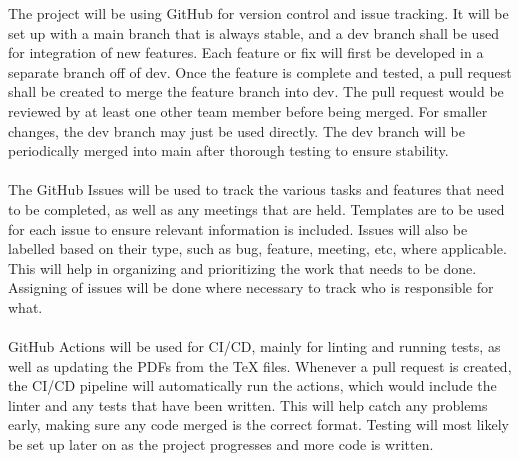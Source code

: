\documentclass{article}
\begin{document}
{	%
  
  The project will be using GitHub for version control and issue tracking. 
  It will be set up with a main branch that is always stable, and
  a dev branch shall be used for integration of new features. Each feature 
  or fix will first be developed in a separate branch off of dev. 
  Once the feature is complete and tested, a pull request shall be created 
  to merge the feature branch into dev. The pull request would be 
  reviewed by at least one other team member before being merged. 
  For smaller changes, the dev branch may just be used directly. 
  The dev branch will be periodically merged into main after 
  thorough testing to ensure stability. 
  \\
  \\
  The GitHub Issues will be used to track the various tasks and features 
  that need to be completed, as well as any meetings that are held.
  Templates are to be used for each issue to ensure relevant 
  information is included. Issues will also be labelled based on their type, 
  such as bug, feature, meeting, etc, where applicable. This will help in 
  organizing and prioritizing the work that needs to be done. 
  Assigning of issues will be done where necessary to track who is responsible 
  for what.
  \\
  \\
  GitHub Actions will be used for CI/CD, mainly for linting and running tests, 
  as well as updating the PDFs from the TeX files. Whenever a pull request is 
  created, the CI/CD pipeline will automatically run the actions, which would 
  include the linter and any tests that have been written. This will help catch 
  any problems early, making sure any code merged is the correct format. 
  Testing will most likely be set up later on as the project progresses and 
  more code is written.


}
\end{document}
